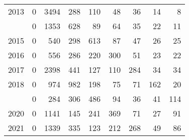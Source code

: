\documentclass[
]{article}
\begin{document}
\begin{longtable}[t]{lrrrrrrrr}
2013 & 0 & 3494 & 288 & 110 & 48 & 36 & 14 & 8\\
\addlinespace
2014 & 0 & 1353 & 628 & 89 & 64 & 35 & 22 & 11\\
2015 & 0 & 540 & 298 & 613 & 87 & 47 & 26 & 25\\
2016 & 0 & 556 & 286 & 220 & 300 & 51 & 23 & 22\\
2017 & 0 & 2398 & 441 & 127 & 110 & 284 & 34 & 34\\
2018 & 0 & 974 & 982 & 198 & 75 & 71 & 162 & 20\\
\addlinespace
2019 & 0 & 284 & 306 & 486 & 94 & 36 & 41 & 114\\
2020 & 0 & 1141 & 145 & 241 & 369 & 71 & 27 & 91\\
2021 & 0 & 1339 & 335 & 123 & 212 & 268 & 49 & 86\\*
\end{longtable}
\end{document}
